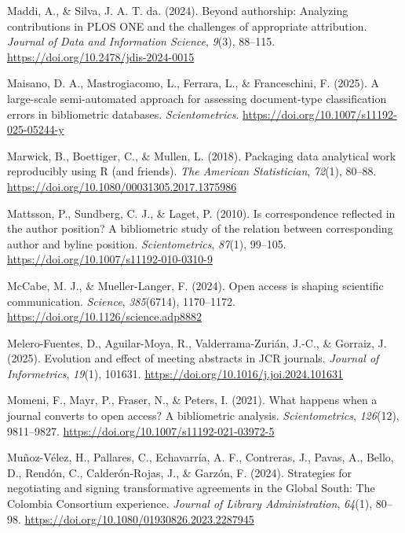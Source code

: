 \documentclass[a4paper,man,floatsintext,longtable,noextraspace,10pt]{apa6}
\newlength{\cslhangindent}
\newenvironment{CSLReferences}[2] %
{\begin{list}{}{%
  \setlength{\itemindent}{0pt}
  \setlength{\leftmargin}{0pt}
  \setlength{\parsep}{0pt}
  \ifodd #1
  \setlength{\leftmargin}{\cslhangindent}
  \setlength{\itemindent}{-1\cslhangindent}
  \fi
  \setlength{\itemsep}{#2\baselineskip}}}
{\end{list}}
\begin{document}
\begin{CSLReferences}{1}{0}
Maddi, A., \& Silva, J. A. T. da. (2024). Beyond authorship: Analyzing
contributions in PLOS ONE and the challenges of appropriate attribution.
\emph{Journal of Data and Information Science}, \emph{9}(3), 88--115.
\url{https://doi.org/10.2478/jdis-2024-0015}

Maisano, D. A., Mastrogiacomo, L., Ferrara, L., \& Franceschini, F.
(2025). A large-scale semi-automated approach for assessing
document-type classification errors in bibliometric databases.
\emph{Scientometrics}. \url{https://doi.org/10.1007/s11192-025-05244-y}

Marwick, B., Boettiger, C., \& Mullen, L. (2018). Packaging data
analytical work reproducibly using {R} (and friends). \emph{The American
Statistician}, \emph{72}(1), 80--88.
\url{https://doi.org/10.1080/00031305.2017.1375986}

Mattsson, P., Sundberg, C. J., \& Laget, P. (2010). Is correspondence
reflected in the author position? A bibliometric study of the relation
between corresponding author and byline position. \emph{Scientometrics},
\emph{87}(1), 99--105. \url{https://doi.org/10.1007/s11192-010-0310-9}

McCabe, M. J., \& Mueller-Langer, F. (2024). Open access is shaping
scientific communication. \emph{Science}, \emph{385}(6714), 1170--1172.
\url{https://doi.org/10.1126/science.adp8882}

Melero-Fuentes, D., Aguilar-Moya, R., Valderrama-Zurián, J.-C., \&
Gorraiz, J. (2025). Evolution and effect of meeting abstracts in JCR
journals. \emph{Journal of Informetrics}, \emph{19}(1), 101631.
\url{https://doi.org/10.1016/j.joi.2024.101631}

Momeni, F., Mayr, P., Fraser, N., \& Peters, I. (2021). What happens
when a journal converts to open access? A bibliometric analysis.
\emph{Scientometrics}, \emph{126}(12), 9811--9827.
\url{https://doi.org/10.1007/s11192-021-03972-5}

Muñoz-Vélez, H., Pallares, C., Echavarría, A. F., Contreras, J., Pavas,
A., Bello, D., Rendón, C., Calderón-Rojas, J., \& Garzón, F. (2024).
Strategies for negotiating and signing transformative agreements in the
{Global South}: The {Colombia Consortium} experience. \emph{Journal of
Library Administration}, \emph{64}(1), 80--98.
\url{https://doi.org/10.1080/01930826.2023.2287945}


\end{CSLReferences}
\end{document}
